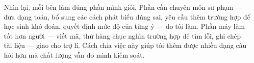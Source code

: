 Nhìn lại, mỗi bên làm đúng phần mình giỏi. Phần cần chuyên môn sư phạm --- đưa
dạng toán, bổ sung các cách phát biểu đúng sai, yêu cầu thêm trường hợp để học
sinh khó đoán, quyết định mức độ của từng ý --- do tôi làm. Phần máy làm tốt hơn
người --- viết mã, thử hàng chục nghìn trường hợp để tìm lỗi, ghi chép tài liệu
--- giao cho trợ lí. Cách chia việc này giúp tôi thêm được nhiều dạng câu hỏi
hơn mà chất lượng vẫn do mình kiểm soát.


\bigskip
